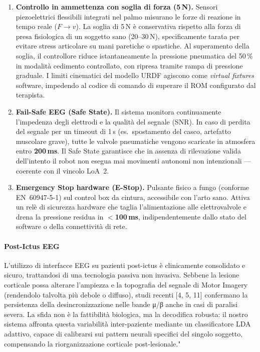 \documentclass[a4paper,11pt]{article}
\begin{document}
\begin{enumerate}

    \item \textbf{Controllo in ammettenza con soglia di forza (5\,N).}
    Sensori piezoelettrici flessibili integrati nel palmo misurano le forze di
    reazione in tempo reale ($F \to v$). La soglia di 5\,N è conservativa rispetto
    alla forza di presa fisiologica di un soggetto sano (20--30\,N), specificamente
    tarata per evitare stress articolare su mani paretiche o spastiche. Al
    superamento della soglia, il controllore riduce istantaneamente la pressione
    pneumatica del 50\,\% in modalità cedimento controllato, con ripresa tramite
    rampa di pressione graduale. I limiti cinematici del modello URDF agiscono come
    \textit{virtual fixtures} software, impedendo al codice di comando di superare
    il ROM configurato dal terapista.

    \item \textbf{Fail-Safe EEG (Safe State).}
    Il sistema monitora continuamente l'impedenza degli elettrodi e la qualità del
    segnale (SNR). In caso di perdita del segnale per un timeout di 1\,s (es.\
    spostamento del casco, artefatto muscolare grave), tutte le valvole pneumatiche
    vengono scaricate in atmosfera entro \textbf{200\,ms}. Il Safe State garantisce
    che in assenza di rilevazione valida dell'intento il robot non esegua mai
    movimenti autonomi non intenzionali — coerente con il vincolo LoA~2.

    \item \textbf{Emergency Stop hardware (E-Stop).}
    Pulsante fisico a fungo (conforme EN~60947-5-1) sul control box da cintura,
    accessibile con l'arto sano. Attiva un relè di sicurezza hardware che taglia
    l'alimentazione alle elettrovalvole e drena la pressione residua in
    \textbf{$<$100\,ms}, indipendentemente dallo stato del software o della
    connettività di rete.

\end{enumerate}

\paragraph{Post-Ictus EEG}
L'utilizzo di interfacce EEG su pazienti post-ictus è clinicamente consolidato e sicuro, trattandosi 
di una tecnologia passiva non invasiva. Sebbene la lesione corticale possa alterare l'ampiezza e la 
topografia del segnale di Motor Imagery (rendendolo talvolta più debole o diffuso), studi recenti [4, 5, 11] 
confermano la persistenza della desincronizzazione nelle bande μ/β anche in casi di paralisi severa. 
La sfida non è la fattibilità biologica, ma la decodifica robusta: il nostro sistema affronta questa
variabilità inter-paziente mediante un classificatore LDA adattivo, capace di calibrarsi sui pattern 
neurali specifici del singolo soggetto, compensando la riorganizzazione corticale post-lesionale."
\end{document}
